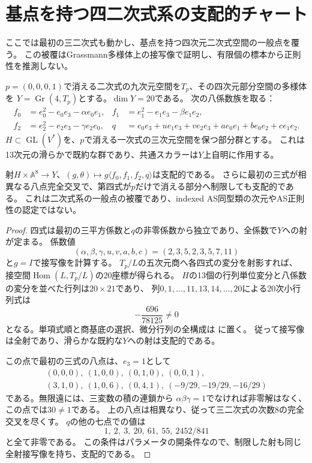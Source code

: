 \section{基点を持つ四二次式系の支配的チャート}
\label{sec:product-net-boundary}
ここでは最初の三二次式も動かし、基点を持つ四次元二次式空間の一般点を覆う。
この被覆はGrassmann多様体上の接写像で証明し、有限個の標本から正則性を推測しない。

$p=(0,0,0,1)$で消える二次式の九次元空間を$T_p$、その四次元部分空間の多様体を
$Y=\operatorname{Gr}(4,T_p)$とする。$\dim Y=20$である。
次の八係数族を取る：
\begin{align*}
 f_0&=e_0^2-e_0e_3-\alpha e_0e_1,&
 f_1&=e_1^2-e_1e_3-\beta e_1e_2,\\
 f_2&=e_2^2-e_2e_3-\gamma e_2e_0,&
 q&=e_0e_3+u e_1e_3+v e_2e_3+a e_0e_1+b e_0e_2+c e_1e_2.
\end{align*}
$H\subset\operatorname{GL}(V^*)$を、$p$で消える一次式の三次元空間を保つ部分群とする。
これは13次元の滑らかで既約な群であり、共通スカラーは$Y$上自明に作用する。

\begin{theorem}[八係数積型netチャートの支配性]\label{thm:product-net-dominance}
射$H\times\mathbb A^8\to Y$、$(g,\theta)\mapsto g\langle f_0,f_1,f_2,q\rangle$は支配的である。
さらに最初の三式が相異なる八点完全交叉で、第四式が$p$だけで消える部分へ制限しても支配的である。
これは二次式系の一般点の被覆であり、indexed AS同型類の次元やAS正則性の認定ではない。
\end{theorem}
\begin{proof}
四式は最初の三平方係数と$q$の非零係数から独立であり、全係数で$Y$への射が定まる。
係数値
\[
 (\alpha,\beta,\gamma,u,v,a,b,c)=(2,3,5,2,3,5,7,11)
\]
と$g=I$で接写像を計算する。
$T_p/L$の五次元商へ各四式の変分を射影すれば、
接空間$\operatorname{Hom}(L,T_p/L)$の20座標が得られる。
$H$の13個の行列単位変分と八係数の変分を並べた行列は$20\times21$であり、
列$0,1,\ldots,11,13,14,\ldots,20$による20次小行列式は
\[
 -\frac{696}{78125}\ne0
\]
となる。単項式順と商基底の選択、微分行列の全構成は
に置く。
従って接写像は全射であり、滑らかな既約な$Y$への射は支配的である。

この点で最初の三式の八点は、$e_3=1$として
\[
\begin{gathered}
(0,0,0),\ (1,0,0),\ (0,1,0),\ (0,0,1),\\
(3,1,0),\ (1,0,6),\ (0,4,1),\ (-9/29,-19/29,-16/29)
\end{gathered}
\]
である。無限遠には、三変数の積の連鎖から
$\alpha\beta\gamma=1$でなければ非零解はなく、この点では$30\ne1$である。
上の八点は相異なり、従って三二次式の次数8の完全交叉を尽くす。
$q$の他の七点での値は
\[
1,\ 2,\ 3,\ 20,\ 61,\ 55,\ 2452/841
\]
と全て非零である。
この条件はパラメータの開条件なので、制限した射も同じ全射接写像を持ち、支配的である。
\end{proof}

